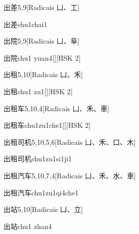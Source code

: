 \begin{entry}{出差}{5,9}[Radicais ⼐、⼯]
  \begin{phonetics}{出差}{chu1chai1}
  \end{phonetics}
\end{entry}

\begin{entry}{出院}{5,9}[Radicais ⼐、⾩]
  \begin{phonetics}{出院}{chu1 yuan4}[][HSK 2]
  \end{phonetics}
\end{entry}

\begin{entry}{出租}{5,10}[Radicais ⼐、⽲]
  \begin{phonetics}{出租}{chu1 zu1}[][HSK 2]
  \end{phonetics}
\end{entry}

\begin{entry}{出租车}{5,10,4}[Radicais ⼐、⽲、⾞]
  \begin{phonetics}{出租车}{chu1zu1che1}[][HSK 2]
  \end{phonetics}
\end{entry}

\begin{entry}{出租司机}{5,10,5,6}[Radicais ⼐、⽲、⼝、⽊]
  \begin{phonetics}{出租司机}{chu1zu1si1ji1}
  \end{phonetics}
\end{entry}

\begin{entry}{出租汽车}{5,10,7,4}[Radicais ⼐、⽲、⽔、⾞]
  \begin{phonetics}{出租汽车}{chu1zu1qi4che1}
  \end{phonetics}
\end{entry}

\begin{entry}{出站}{5,10}[Radicais ⼐、⽴]
  \begin{phonetics}{出站}{chu1 zhan4}
  \end{phonetics}
\end{entry}

